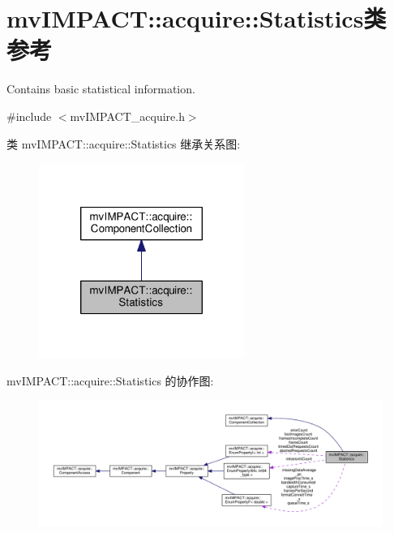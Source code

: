 \hypertarget{classmv_i_m_p_a_c_t_1_1acquire_1_1_statistics}{\section{mv\+I\+M\+P\+A\+C\+T\+:\+:acquire\+:\+:Statistics类 参考}
\label{classmv_i_m_p_a_c_t_1_1acquire_1_1_statistics}
}


Contains basic statistical information.  




{\ttfamily \#include $<$mv\+I\+M\+P\+A\+C\+T\+\_\+acquire.\+h$>$}



类 mv\+I\+M\+P\+A\+C\+T\+:\+:acquire\+:\+:Statistics 继承关系图\+:
\nopagebreak
\begin{figure}[H]
\begin{center}
\leavevmode
\includegraphics[width=190pt]{classmv_i_m_p_a_c_t_1_1acquire_1_1_statistics__inherit__graph}
\end{center}
\end{figure}


mv\+I\+M\+P\+A\+C\+T\+:\+:acquire\+:\+:Statistics 的协作图\+:
\nopagebreak
\begin{figure}[H]
\begin{center}
\leavevmode
\includegraphics[width=350pt]{classmv_i_m_p_a_c_t_1_1acquire_1_1_statistics__coll__graph}
\end{center}
\end{figure}
